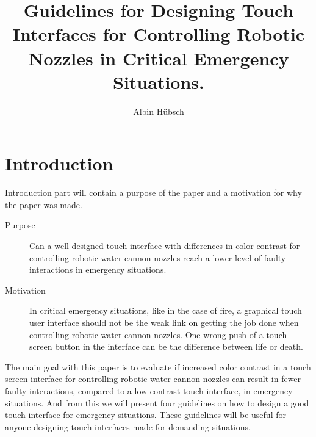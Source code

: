 \documentclass[runningheads,a4paper,oribibl]{llncs}
\begin{document}
\pagestyle{headings}

\mainmatter

\title{Guidelines for Designing Touch Interfaces for Controlling Robotic Nozzles in Critical Emergency Situations.}


\author{Albin Hübsch}


\maketitle

%
%

\section{Introduction}
Introduction part will contain a purpose of the paper and a motivation for why the paper was made.

\begin{description}
	\item[Purpose] Can a well designed touch interface with differences in color contrast for controlling robotic water cannon nozzles reach a lower level of faulty interactions in emergency situations.
	\item[Motivation] In critical emergency situations, like in the case of fire, a graphical touch user interface should not be the weak link on getting the job done when controlling robotic water cannon nozzles. One wrong push of a touch screen button in the interface can be the difference between life or death.
\end{description}
The main goal with this paper is to evaluate if increased color contrast in a touch screen interface for controlling robotic water cannon nozzles can result in fewer faulty interactions, compared to a low contrast touch interface, in emergency situations. And from this we will present four guidelines on how to design a good touch interface for emergency situations. These guidelines will be useful for anyone designing touch interfaces made for demanding situations.
\end{document}
